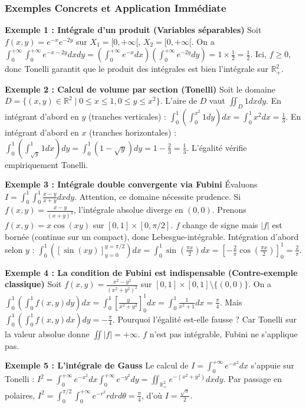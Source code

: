 \documentclass[11pt,a4paper]{article}
\begin{document}
\subsubsection{Exemples Concrets et Application Immédiate}

\textbf{Exemple 1 : Intégrale d'un produit (Variables séparables)}
Soit $f(x,y) = e^{-x} e^{-2y}$ sur $X_1 = [0, +\infty[$, $X_2 = [0, +\infty[$.
On a $\int_{0}^{+\infty} \int_{0}^{+\infty} e^{-x-2y} dx dy = \left( \int_0^{+\infty} e^{-x} dx \right) \left( \int_0^{+\infty} e^{-2y} dy \right) = 1 \times \frac{1}{2} = \frac{1}{2}$.
Ici, $f \ge 0$, donc Tonelli garantit que le produit des intégrales est bien l'intégrale sur $\mathbb{R}_+^2$.

\textbf{Exemple 2 : Calcul de volume par section (Tonelli)}
Soit le domaine $D = \{(x,y) \in \mathbb{R}^2 \mid 0 \le x \le 1, 0 \le y \le x^2\}$.
L'aire de $D$ vaut $\iint_D 1 dx dy$.
En intégrant d'abord en $y$ (tranches verticales) : $\int_0^1 \left( \int_0^{x^2} 1 dy \right) dx = \int_0^1 x^2 dx = \frac{1}{3}$.
En intégrant d'abord en $x$ (tranches horizontales) : $\int_0^1 \left( \int_{\sqrt{y}}^1 1 dx \right) dy = \int_0^1 (1 - \sqrt{y}) dy = 1 - \frac{2}{3} = \frac{1}{3}$.
L'égalité vérifie empiriquement Tonelli.

\textbf{Exemple 3 : Intégrale double convergente via Fubini}
Évaluons $I = \int_{0}^1 \int_0^1 \frac{x-y}{x+y} dx dy$.
Attention, ce domaine nécessite prudence. Si $f(x,y) = \frac{x-y}{(x+y)^3}$, l'intégrale absolue diverge en $(0,0)$.
Prenons $f(x,y) = x \cos(xy)$ sur $[0,1] \times [0,\pi/2]$. $f$ change de signe mais $|f|$ est bornée (continue sur un compact), donc Lebesgue-intégrable.
Intégration d'abord selon $y$ : $\int_0^1 \left( [ \sin(xy) ]_{y=0}^{y=\pi/2} \right) dx = \int_0^1 \sin(\frac{\pi x}{2}) dx = [-\frac{2}{\pi} \cos(\frac{\pi x}{2})]_0^1 = \frac{2}{\pi}$.

\textbf{Exemple 4 : La condition de Fubini est indispensable (Contre-exemple classique)}
Soit $f(x,y) = \frac{x^2-y^2}{(x^2+y^2)^2}$ sur $[0,1] \times [0,1] \setminus \{(0,0)\}$.
On a $\int_0^1 \left( \int_0^1 f(x,y) dy \right) dx = \int_0^1 [\frac{y}{x^2+y^2}]_0^1 dx = \int_0^1 \frac{1}{x^2+1} dx = \frac{\pi}{4}$.
Mais $\int_0^1 \left( \int_0^1 f(x,y) dx \right) dy = -\frac{\pi}{4}$.
Pourquoi l'égalité est-elle fausse ? Car Tonelli sur la valeur absolue donne $\iint |f| = +\infty$. $f$ n'est pas intégrable, Fubini ne s'applique pas.

\textbf{Exemple 5 : L'intégrale de Gauss}
Le calcul de $I = \int_0^{+\infty} e^{-x^2} dx$ s'appuie sur Tonelli : $I^2 = \int_0^{+\infty} e^{-x^2} dx \int_0^{+\infty} e^{-y^2} dy = \iint_{\mathbb{R}_+^2} e^{-(x^2+y^2)} dx dy$.
Par passage en polaires, $I^2 = \int_0^{\pi/2} \int_0^{+\infty} e^{-r^2} r dr d\theta = \frac{\pi}{4}$, d'où $I = \frac{\sqrt{\pi}}{2}$.
\end{document}

